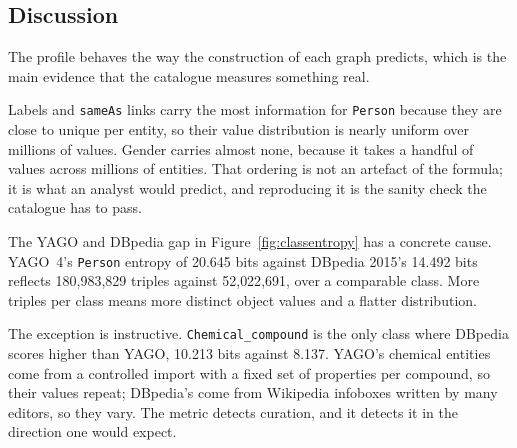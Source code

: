 \begin{table}[htbp]
  \centering
  \caption[]{The predicate
    with the most distinct object values for each pinned class, from metric~6, in
    YAGO~4.5.0.2 and DBpedia 2025. DBpedia's \texttt{Species} is reported under
    the YAGO name \texttt{Taxon}; see the discussion for why its 2025 row
    matches \texttt{Person}.}
  \label{tab:diversity}
  \footnotesize
\end{table}

\subsection{Discussion}

The profile behaves the way the construction of each graph predicts, which is the
main evidence that the catalogue measures something real.

Labels and \texttt{sameAs} links carry the most information for
\texttt{Person} because they are close to unique per entity, so their value
distribution is nearly uniform over millions of values. Gender carries almost
none, because it takes a handful of values across millions of entities. That
ordering is not an artefact of the formula; it is what an analyst would predict,
and reproducing it is the sanity check the catalogue has to pass.

The YAGO and DBpedia gap in Figure~\ref{fig:classentropy} has a concrete cause.
YAGO~4's \texttt{Person} entropy of 20.645 bits against DBpedia 2015's 14.492
bits reflects 180{,}983{,}829 triples against 52{,}022{,}691, over a comparable
class. More triples per class means more distinct object values and a flatter
distribution.

The exception is instructive. \texttt{Chemical\_compound} is the only class where
DBpedia scores higher than YAGO, 10.213 bits against 8.137. YAGO's chemical
entities come from a controlled import with a fixed set of properties per
compound, so their values repeat; DBpedia's come from Wikipedia infoboxes written
by many editors, so they vary. The metric detects curation, and it detects it in
the direction one would expect.

